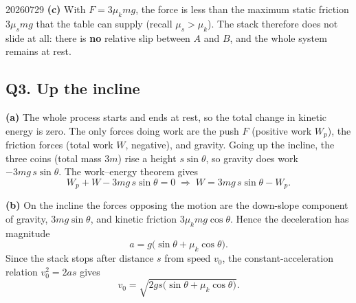 \begin{solution}{20260729}
\textbf{(c)}  With $F = 3\mu_k m g$, the force is less than the maximum static friction $3\mu_s m g$ that the table can supply (recall $\mu_s > \mu_k$).  The stack therefore does not slide at all: there is \textbf{no} relative slip between $A$ and $B$, and the whole system remains at rest.

\subsection*{Q3. Up the incline}

\textbf{(a)}  The whole process starts and ends at rest, so the total change in kinetic energy is zero.  The only forces doing work are the push $F$ (positive work $W_p$), the friction forces (total work $W$, negative), and gravity.  Going up the incline, the three coins (total mass $3m$) rise a height $s\sin\theta$, so gravity does work $-3mg\,s\sin\theta$.  The work--energy theorem gives
\[
  W_p + W - 3mg\,s\sin\theta = 0
  \;\Longrightarrow\;
  \boxed{W = 3mg\,s\sin\theta - W_p}.
\]

\textbf{(b)}  On the incline the forces opposing the motion are the down-slope component of gravity, $3mg\sin\theta$, and kinetic friction $3\mu_k m g\cos\theta$.  Hence the deceleration has magnitude
\[
  \boxed{a = g\bigl(\sin\theta + \mu_k\cos\theta\bigr)}.
\]
Since the stack stops after distance $s$ from speed $v_0$, the constant-acceleration relation $v_0^{2} = 2as$ gives
\[
  \boxed{v_0 = \sqrt{2gs\bigl(\sin\theta + \mu_k\cos\theta\bigr)}}.
\]

\end{solution}


